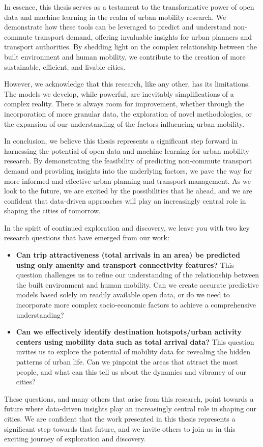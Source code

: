 In essence, this thesis serves as a testament to the transformative power of open data and machine learning in the realm of urban mobility research. We demonstrate how these tools can be leveraged to predict and understand non-commute transport demand, offering invaluable insights for urban planners and transport authorities. By shedding light on the complex relationship between the built environment and human mobility, we contribute to the creation of more sustainable, efficient, and livable cities.

However, we acknowledge that this research, like any other, has its limitations. The models we develop, while powerful, are inevitably simplifications of a complex reality. There is always room for improvement, whether through the incorporation of more granular data, the exploration of novel methodologies, or the expansion of our understanding of the factors influencing urban mobility.

In conclusion, we believe this thesis represents a significant step forward in harnessing the potential of open data and machine learning for urban mobility research. By demonstrating the feasibility of predicting non-commute transport demand and providing insights into the underlying factors, we pave the way for more informed and effective urban planning and transport management. As we look to the future, we are excited by the possibilities that lie ahead, and we are confident that data-driven approaches will play an increasingly central role in shaping the cities of tomorrow.

In the spirit of continued exploration and discovery, we leave you with two key research questions that have emerged from our work:

\begin{itemize}
    \item \textbf{Can trip attractiveness (total arrivals in an area) be predicted using only amenity and transport connectivity features?} This question challenges us to refine our understanding of the relationship between the built environment and human mobility. Can we create accurate predictive models based solely on readily available open data, or do we need to incorporate more complex socio-economic factors to achieve a comprehensive understanding?
    \item \textbf{Can we effectively identify destination hotspots/urban activity centers using mobility data such as total arrival data?} This question invites us to explore the potential of mobility data for revealing the hidden patterns of urban life. Can we pinpoint the areas that attract the most people, and what can this tell us about the dynamics and vibrancy of our cities?
\end{itemize}

These questions, and many others that arise from this research, point towards a future where data-driven insights play an increasingly central role in shaping our cities. We are confident that the work presented in this thesis represents a significant step towards that future, and we invite others to join us in this exciting journey of exploration and discovery.
